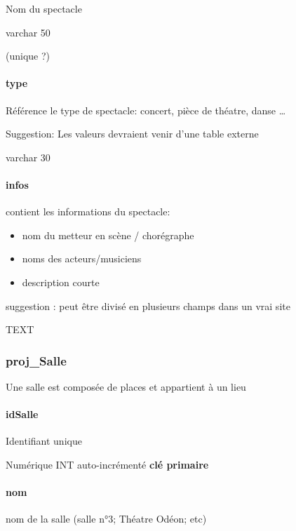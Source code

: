 Nom du spectacle

varchar 50

(unique ?)

\paragraph{type}\label{type}

Référence le type de spectacle: concert, pièce de théatre, danse
\ldots{}

Suggestion: Les valeurs devraient venir d'une table externe

varchar 30

\paragraph{infos}\label{infos}

contient les informations du spectacle:

\begin{itemize}
\tightlist
\item
  nom du metteur en scène / chorégraphe
\item
  noms des acteurs/musiciens
\item
  description courte
\end{itemize}

suggestion : peut être divisé en plusieurs champs dans un vrai site

TEXT

\subsubsection{proj\_Salle}\label{projux5fsalle}

Une salle est composée de places et appartient à un lieu

\paragraph{\texorpdfstring{\textbf{idSalle}}{idSalle}}\label{idsalle}

Identifiant unique

Numérique INT auto-incrémenté \textbf{clé primaire}

\paragraph{nom}\label{nom-2}

nom de la salle (salle n°3; Théatre Odéon; etc)

